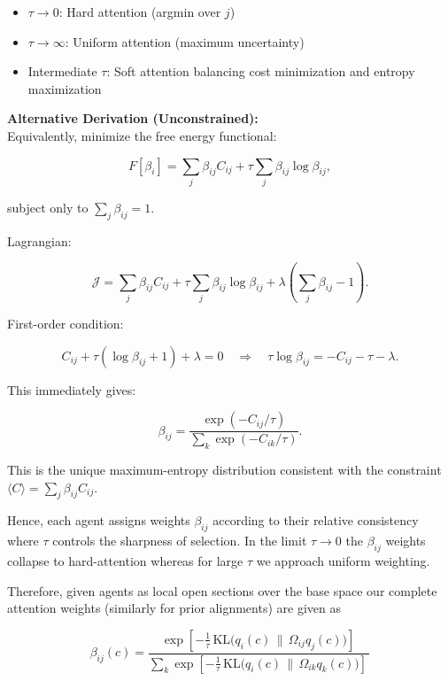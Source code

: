 \documentclass[11pt]{article}
\begin{document}
\begin{itemize}
  \item $\tau \to 0$: Hard attention (argmin over $j$)
  \item $\tau \to \infty$: Uniform attention (maximum uncertainty)
  \item Intermediate $\tau$: Soft attention balancing cost minimization and entropy maximization
\end{itemize}

\textbf{Alternative Derivation (Unconstrained):}\\
Equivalently, minimize the free energy functional:

\begin{equation}
F[\beta_i] = \sum_j \beta_{ij} C_{ij} + \tau \sum_j \beta_{ij}\log\beta_{ij},
\end{equation}

subject only to $\sum_j \beta_{ij} = 1$.

Lagrangian:

\begin{equation}
\mathcal{J} = \sum_j \beta_{ij} C_{ij} + \tau \sum_j \beta_{ij}\log\beta_{ij} + \lambda\left(\sum_j \beta_{ij} - 1\right).
\end{equation}

First-order condition:

\begin{equation}
C_{ij} + \tau(\log\beta_{ij} + 1) + \lambda = 0
\quad \Rightarrow \quad
\tau\log\beta_{ij} = -C_{ij} - \tau - \lambda.
\end{equation}

This immediately gives:

\begin{equation}
\beta_{ij} = \frac{\exp(-C_{ij}/\tau)}{\sum_k \exp(-C_{ik}/\tau)}.
\end{equation}

This is the unique maximum-entropy distribution consistent with the constraint $\langle C \rangle = \sum_j \beta_{ij} C_{ij}$.

Hence, each agent assigns weights $\beta_{ij}$ according to their relative consistency where $\tau$ controls the sharpness of selection. In the limit $\tau \rightarrow 0$ the $\beta_{ij}$ weights collapse to hard-attention whereas for large $\tau$ we approach uniform weighting.

Therefore, given agents as local open sections over the base space our complete attention weights (similarly for prior alignments) are given as

$$
\beta_{ij}(c) =
\frac{
  \exp\!\left[
    -\tfrac{1}{\tau}\,
    \mathrm{KL}\!\big(
      q_i(c)
      \,\big\|\,
      \Omega_{ij}q_j(c)
    \big)
  \right]
  \, 
}{
  \displaystyle
  \sum_{k}
  \exp\!\left[
    -\tfrac{1}{\tau}\,
    \mathrm{KL}\!\big(
      q_i(c)
      \,\big\|\,
      \Omega_{ik}q_k(c)
    \big)
  \right]
  \, 
}
$$



 

\end{document}
